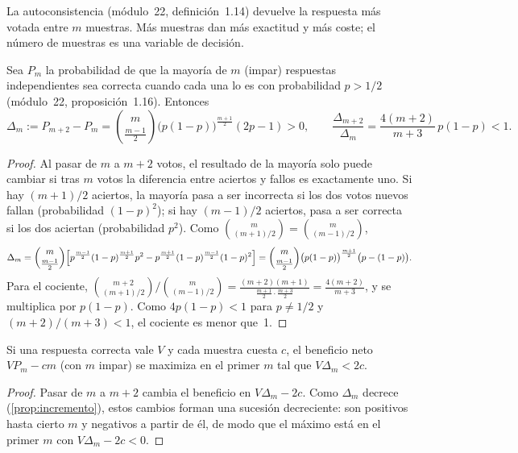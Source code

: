 La autoconsistencia (módulo~22, definición~1.14) devuelve la respuesta más votada entre $m$ muestras. Más muestras dan más exactitud y más coste; el número de muestras es una variable de decisión.

\begin{proposicion}\label{prop:incremento}
Sea $P_m$ la probabilidad de que la mayoría de $m$ (impar) respuestas independientes sea correcta cuando cada una lo es con probabilidad $p>1/2$ (módulo~22, proposición~1.16). Entonces
\[
\Delta_m:=P_{m+2}-P_m=\binom{m}{\frac{m-1}{2}}\bigl(p(1-p)\bigr)^{\frac{m+1}{2}}(2p-1)>0,\qquad \frac{\Delta_{m+2}}{\Delta_m}=\frac{4(m+2)}{m+3}\,p(1-p)<1 .
\]
\end{proposicion}

\begin{proof}
Al pasar de $m$ a $m+2$ votos, el resultado de la mayoría solo puede cambiar si tras $m$ votos la diferencia entre aciertos y fallos es exactamente uno. Si hay $(m+1)/2$ aciertos, la mayoría pasa a ser incorrecta si los dos votos nuevos fallan (probabilidad $(1-p)^2$); si hay $(m-1)/2$ aciertos, pasa a ser correcta si los dos aciertan (probabilidad $p^2$). Como $\binom{m}{(m+1)/2}=\binom{m}{(m-1)/2}$,
\[
\Delta_m=\binom{m}{\frac{m-1}{2}}\Bigl[p^{\frac{m-1}{2}}(1-p)^{\frac{m+1}{2}}p^{2}-p^{\frac{m+1}{2}}(1-p)^{\frac{m-1}{2}}(1-p)^{2}\Bigr]=\binom{m}{\frac{m-1}{2}}\bigl(p(1-p)\bigr)^{\frac{m+1}{2}}\bigl(p-(1-p)\bigr).
\]
Para el cociente, $\binom{m+2}{(m+1)/2}\big/\binom{m}{(m-1)/2}=\frac{(m+2)(m+1)}{\frac{m+1}{2}\cdot\frac{m+3}{2}}=\frac{4(m+2)}{m+3}$, y se multiplica por $p(1-p)$. Como $4p(1-p)<1$ para $p\ne 1/2$ y $(m+2)/(m+3)<1$, el cociente es menor que~1.
\end{proof}

\begin{corolario}\label{cor:m-optimo}
Si una respuesta correcta vale $V$ y cada muestra cuesta $c$, el beneficio neto $V P_m-cm$ (con $m$ impar) se maximiza en el primer $m$ tal que $V\Delta_m<2c$.
\end{corolario}

\begin{proof}
Pasar de $m$ a $m+2$ cambia el beneficio en $V\Delta_m-2c$. Como $\Delta_m$ decrece (\cref{prop:incremento}), estos cambios forman una sucesión decreciente: son positivos hasta cierto $m$ y negativos a partir de él, de modo que el máximo está en el primer $m$ con $V\Delta_m-2c<0$.
\end{proof}

